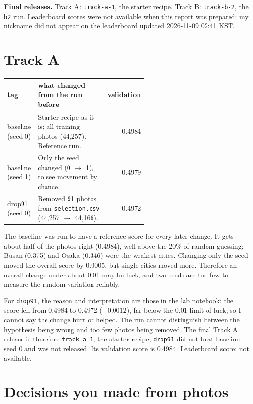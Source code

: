\documentclass[11pt]{article}
\begin{document}
\makeheader

\textbf{Final releases.} Track A: \texttt{track-a-1}, the starter recipe. Track B:
\texttt{track-b-2}, the \texttt{b2} run. Leaderboard scores were not available when
this report was prepared: my nickname did not appear on the leaderboard updated 2026-11-09 02:41 KST.

\section*{Track A}

\begin{center}\footnotesize
\begin{tabular}{lp{0.57\linewidth}r}
\toprule
tag & what changed from the run before & validation \\
\midrule
baseline (seed 0) & Starter recipe as it is; all training photos (44,257). Reference run. & 0.4984 \\
baseline (seed 1) & Only the seed changed (0 $\rightarrow$ 1), to see movement by chance. & 0.4979 \\
drop91 (seed 0) & Removed 91 photos from \texttt{selection.csv} (44,257 $\rightarrow$ 44,166). & 0.4972 \\
\bottomrule
\end{tabular}
\end{center}

The baseline was run to have a reference score for every later change. It gets
about half of the photos right (0.4984), well above the 20\% of random guessing;
Busan (0.375) and Osaka (0.346) were the weakest cities. Changing only the seed
moved the overall score by 0.0005, but single cities moved more. Therefore an
overall change under about 0.01 may be luck, and two seeds are too few to measure
the random variation reliably.

For \texttt{drop91}, the reason and interpretation are those in the lab notebook:
the score fell from 0.4984 to 0.4972 ($-0.0012$), far below the 0.01 limit of
luck, so I cannot say the change hurt or helped. The run cannot distinguish
between the hypothesis being wrong and too few photos being removed. The final
Track A release is therefore \texttt{track-a-1}, the starter recipe; \texttt{drop91}
did not beat baseline seed 0 and was not released. Its validation score is 0.4984.
Leaderboard score: not available.

\section*{Decisions you made from photos}
\end{document}

